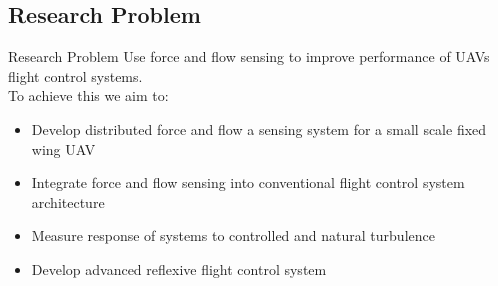 \documentclass[aspectratio=169]{beamer}            %
\begin{document}
\subsection{Research Problem}
\begin{frame}{Research Problem}
  Use force and flow sensing to improve performance of UAVs flight control systems.\\
  \pause
  To achieve this we aim to:
  \begin{itemize}
    \item<3-> Develop distributed force and flow a sensing system for a small scale fixed wing UAV
    \item<4-> Integrate force and flow sensing into conventional flight control system architecture
    \item<5-> Measure response of systems to controlled and natural turbulence
    \item<6-> Develop advanced reflexive flight control system
  \end{itemize}
\end{frame}

\end{document}

